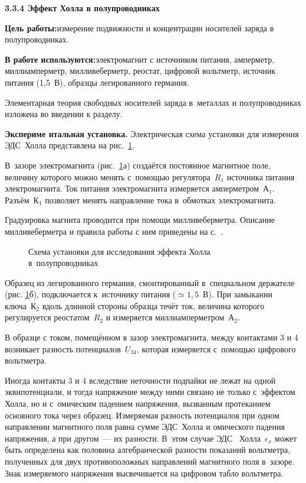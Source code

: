 {\large \bf 3.3.4 Эффект Холла в полупроводниках}

{\bf Цель работы:}{измерение подвижности и концентрации носителей заряда в полупроводниках.}

{\bf В работе используются:}{электромагнит с источником питания, амперметр, миллиамперметр, милливеберметр, реостат, цифровой вольтметр,
источник питания (1,5~В), образцы легированного германия.}

Элементарная теория свободных носителей заряда в~металлах и полупроводниках изложена во введении к разделу.

{\bf Экспериме
нтальная установка.} Электрическая схема установки для измерения ЭДС~Холла представлена на рис.~\ref{fig3.4.1}.

В~зазоре электромагнита (рис.~\ref{fig3.4.1}а) создаётся постоянное магнитное поле, величину которого можно менять с~помощью регулятора~$R_1$ источника питания электромагнита. Ток питания электромагнита измеряется амперметром~А$_1$. Разъём~К$_1$ позволяет менять направление тока в~обмотках электромагнита.

Градуировка магнита проводится при помощи милливеберметра. Описание милливеберметра и правила работы с ним приведены на с.~\pageref{MWB}.

\begin{figure}
\caption{Схема установки для исследования эффекта Холла в~полупроводниках}
\label{fig3.4.1}
\end{figure}

Образец из легированного германия, смонтированный в~специальном держателе (рис. \ref{fig3.4.1}б), подключается к~источнику питания ($\simeq 1,5$~В). При замыкании ключа~К$_2$ вдоль длинной стороны образца течёт ток, величина которого регулируется реостатом~$R_2$ и измеряется миллиамперметром~А$_2$.

В образце с током, помещённом в зазор электромагнита, между контактами 3 и 4 возникает разность потенциалов~$U_{34}$, которая измеряется с~помощью цифрового вольтметра.

Иногда контакты 3 и 4 вследствие неточности подпайки не лежат на одной эквипотенциали, и тогда напряжение между ними связано не только с~эффектом Холла, но и с~омическим падением напряжения, вызванным протеканием основного тока  через образец. Измеряемая разность потенциалов при одном направлении магнитного поля равна сумме ЭДС~Холла и омического падения напряжения, а при другом~--- их разности. В~этом случае ЭДС ~Холла~$\epsilon_x$ может быть определена как половина алгебраической разности показаний вольтметра, полученных для двух противоположных направлений магнитного поля в~зазоре. Знак измеряемого напряжения высвечивается на цифровом табло вольтметра.

